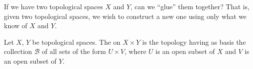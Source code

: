 \begin{prob}
If we have two topological spaces $X$ and $Y$, can we ``glue''
them together? That is, given two topological spaces, we wish to
construct a new one using only what we know of $X$ and $Y$.
\end{prob}

\begin{defn}\label{defn:productTopology}
Let $X$, $Y$ be topological spaces. The 
on $X\times Y$ is the topology having as basis the collection
$\mathscr{B}$ of all sets of the form $U\times V$, where $U$ is
an open subset of $X$ and $V$ is an open subset of $Y$.
\end{defn}

